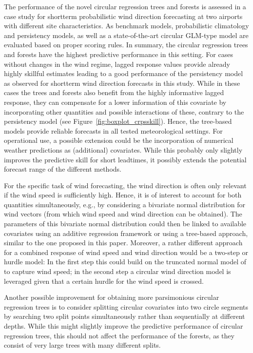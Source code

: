 \documentclass{statsoc}
\begin{document}
The performance of the novel circular regression trees and forests is assessed
in a case study for shortterm probabilistic wind direction forecasting at two
airports with different site characteristics. As benchmark models,
probabilistic climatology and persistency models, as well as a state-of-the-art
circular GLM-type model are evaluated based on proper scoring rules. In
summary, the circular regression trees and forests have the highest predictive
performance in this setting. For cases without changes in the wind regime,
lagged response values provide already highly skillful estimates leading to a
good performance of the persistency model as observed for shortterm wind
direction forecasts in this study. While in these cases the trees and forests
also benefit from the highly informative lagged response, they can compensate
for a lower information of this covariate by incorporating other quantities and
possible interactions of these, contrary to the persistency model (see
Figure~\ref{fig:boxplot_crpsskill}). Hence, the tree-based models provide
reliable forecasts in all tested meteorological settings. For operational use,
a possible extension could be the incorporation of numerical weather
predictions as (additional) covariates. While this probably only slightly
improves the predictive skill for short leadtimes, it possibly extends the
potential forecast range of the different methods.

For the specific task of wind forecasting, the wind direction is often only
relevant if the wind speed is sufficiently high. Hence, it is of interest to
account for both quantities simultaneously, e.g., by considering a bivariate
normal distribution for wind vectors (from which wind speed and wind direction
can be obtained). The parameters of this bivariate normal distribution could
then be linked to available covariates using an additive regression framework
\citep[as proposed by][]{Lang+Mayr+Stauffer:2019} or using a tree-based
approach, similar to the one proposed in this paper. Moreover, a rather
different approach for a combined response of wind speed and wind direction
would be a two-step or hurdle model: In the first step this could build on the
truncated normal model of \cite{Thorarinsdottir+Gneiting:2010} to capture wind
speed; in the second step a circular wind direction model is leveraged given
that a certain hurdle for the wind speed is crossed.

Another possible improvement for obtaining more parsimonious circular
regression trees is to consider splitting circular covariates into two circle
segments by searching two split points simultaneously rather than sequentially
at different depths. While this might slightly improve the predictive
performance of circular regression trees, this should not affect the
performance of the forests, as they consist of very large trees with many
different splits.
\end{document}
